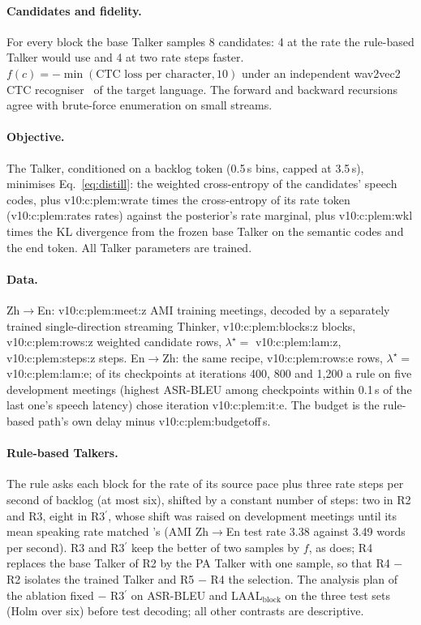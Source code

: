 \paragraph{Candidates and fidelity.} For every block the base Talker samples 8 candidates: 4 at the rate the
rule-based Talker would use and 4 at two rate steps faster. $f(c)=-\min(\text{CTC loss per character},10)$ under an
independent wav2vec2 CTC recogniser~\citep{baevski2020wav2vec} of the target language. The forward and backward
recursions agree with brute-force enumeration on small streams.

\paragraph{Objective.} The Talker, conditioned on a backlog token (0.5\,s bins, capped at 3.5\,s), minimises
Eq.~\eqref{eq:distill}: the weighted cross-entropy of the candidates' speech codes, plus \num{v10:c:plem:wrate} times the
cross-entropy of its rate token (\num{v10:c:plem:rates} rates) against the posterior's rate marginal, plus
\num{v10:c:plem:wkl} times the KL divergence from the frozen base Talker on the semantic codes and the end token. All
Talker parameters are trained.

\paragraph{Data.} Zh$\rightarrow$En: \num{v10:c:plem:meet:z} AMI training meetings, decoded by a separately trained
single-direction streaming Thinker, \num{v10:c:plem:blocks:z} blocks, \num{v10:c:plem:rows:z} weighted candidate rows,
$\lambda^\star=$ \num{v10:c:plem:lam:z}, \num{v10:c:plem:steps:z} steps. En$\rightarrow$Zh: the same recipe,
\num{v10:c:plem:rows:e} rows, $\lambda^\star=$ \num{v10:c:plem:lam:e}; of its checkpoints at iterations 400, 800 and
1{,}200 a rule on five development meetings (highest ASR-BLEU among checkpoints within 0.1\,s of the last one's speech
latency) chose iteration \num{v10:c:plem:it:e}. The budget is the rule-based path's own delay minus
\num{v10:c:plem:budgetoff}\,s.

\paragraph{Rule-based Talkers.} The rule asks each block for the rate of its source pace plus three rate steps per
second of backlog (at most six), shifted by a constant number of steps: two in R2 and R3, eight in R3$^\prime$, whose
shift was raised on development meetings until its mean speaking rate matched \sys{}'s (AMI Zh$\rightarrow$En test rate
3.38 against 3.49 words per second). R3 and R3$^\prime$ keep the better of two samples by $f$, as \sys{} does; R4
replaces the base Talker of R2 by the PA Talker with one sample, so that R4 $-$ R2 isolates the trained Talker and
R5 $-$ R4 the selection. The analysis plan of the ablation fixed \sys{} $-$ R3$^\prime$ on ASR-BLEU and
LAAL$_\text{block}$ on the three test sets (Holm over six) before test decoding; all other contrasts are descriptive.

